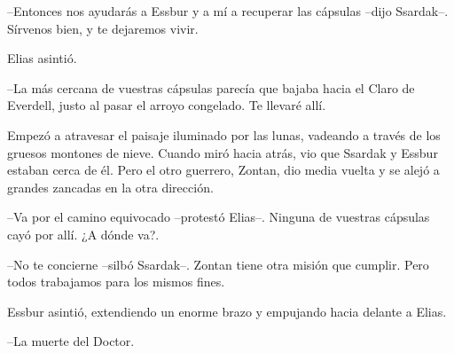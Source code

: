 --Entonces nos ayudarás a Essbur y a mí a recuperar las cápsulas --dijo Ssardak--. Sírvenos bien, y te dejaremos vivir.



Elias asintió.


--La más cercana de vuestras cápsulas parecía que bajaba hacia el Claro de Everdell, justo al pasar el arroyo congelado. Te llevaré allí. 



Empezó a atravesar el paisaje iluminado por las lunas, vadeando a través de los gruesos montones de nieve. Cuando miró hacia atrás, vio que Ssardak y Essbur estaban cerca de él. Pero el otro guerrero, Zontan, dio media vuelta y se alejó a grandes zancadas en la otra dirección.



--Va por el camino equivocado --protestó Elias--. Ninguna de vuestras cápsulas cayó por allí. ¿A dónde va?.



--No te concierne --silbó Ssardak--. Zontan tiene otra misión que cumplir. Pero todos trabajamos para los mismos fines.



Essbur asintió, extendiendo un enorme brazo y empujando hacia delante a Elias. 



--La muerte del Doctor.
